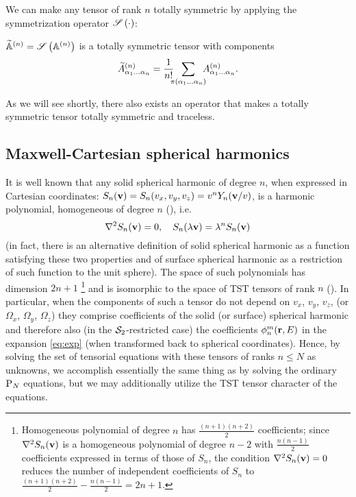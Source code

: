 We can make any tensor of rank $n$ totally symmetric by applying the symmetrization operator $\mathscr{S}\left(\cdot\right)$:
\begin{definition}\label{def:symmetrization}
  $\widetilde{\mathbb{A}}^{(n)} = \mathscr{S}\left(\mathbb{A}^{(n)}\right)$ is a totally symmetric tensor with components
  $$
    \widetilde A^{(n)}_{\alpha_1\ldots\alpha_n} = \frac{1}{n!}\ \; \sum_{\mathclap{\perm{\alpha_1\ldots\alpha_n}}}\ \;\AAA{\alpha_1\ldots\alpha_n}.
  $$
\end{definition}  
As we will see shortly, there also exists an operator that makes a totally symmetric tensor totally symmetric and
traceless.

\subsection{Maxwell-Cartesian spherical harmonics}\label{sec:MCSH}
It is well known that any solid spherical harmonic of degree $n$, when expressed in Cartesian coordinates: $S_n(\mathbf{v}) =
S_n(v_x, v_y, v_z) = v^n Y_n(\mathbf{v}/v)$, is a harmonic polynomial, homogeneous of degree $n$ (\cite[Thm. 3.67]{Schreiner}),
i.e.
$$
  \nabla^2 S_n(\mathbf{v}) = 0,\quad S_n(\lambda\mathbf{v}) = \lambda^n S_n(\mathbf{v})
$$ 
(in fact, there is an alternative definition of solid spherical harmonic as a function satisfying these two
properties and of surface spherical harmonic as a restriction of such function to the unit sphere). The space of such
polynomials has dimension $2n + 1$ \footnote{Homogeneous polynomial of degree $n$ has $\frac{(n+1)(n+2)}{2}$
coefficients; since $\nabla^2 S_n(\mathbf{v})$ is a homogeneous polynomial of degree $n-2$ with $\frac{n(n-1)}{2}$ coefficients
expressed in terms of those of $S_n$, the condition $\nabla^2 S_n(\mathbf{v}) = 0$ reduces the number of independent coefficients
of $S_n$ to $\frac{(n+1)(n+2)}{2} - \frac{n(n-1)}{2} = 2n + 1$.}\label{pg:indepc} and is isomorphic to the space of TST
tensors of rank $n$ (\cite[Chap. 3]{Schreiner}).
In particular, when the components of such a tensor do not depend on $v_x$, $v_y$, $v_z$, (or $\Omega_x$, $\Omega_y$,
$\Omega_z$) they comprise coefficients of the solid (or surface) spherical harmonic and therefore also (in the
$\mathcal{S}_2$-restricted case) the coefficients $\phi_{n}^{m}(\mathbf{r},E)$ in the expansion \eqref{eq:exp} (when transformed
back to spherical coordinates). Hence, by solving the set of tensorial equations with these tensors of ranks $n \leq N$
as unknowns, we accomplish essentially the same thing as by solving the ordinary $\text{P}_{N}$ equations, but we may 
additionally utilize the TST tensor character of the equations.

